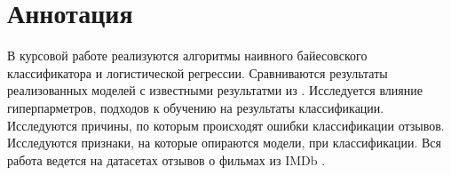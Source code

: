 \chapter*{Аннотация}
В курсовой работе реализуются алгоритмы наивного байесовского классификатора и логистической регрессии. Сравниваются результаты реализованных моделей с известными результатми из \cite{Narayanan:naiveBayes, ensemble:GregoireMesnil}. Исследуется влияние гиперпарметров, подходов к обучению на результаты классификации. Исследуются причины, по которым происходят ошибки классификации отзывов. Исследуются признаки, на которые опираются модели, при классификации. Вся работа ведется на датасетах отзывов о фильмах из IMDb \cite{imdb:data}.